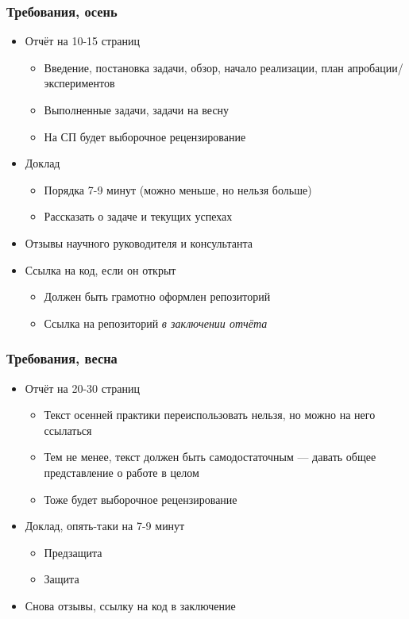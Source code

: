 \documentclass{../../slides-style}
\begin{document}
    \begin{frame}
        \frametitle{Требования, осень}
        \begin{itemize}
            \item Отчёт на 10-15 страниц
            \begin{itemize}
                \item Введение, постановка задачи, обзор, начало реализации, план апробации/экспериментов
                \item Выполненные задачи, задачи на весну
                \item На СП будет выборочное рецензирование
            \end{itemize}
            \item Доклад
            \begin{itemize}
                \item Порядка 7-9 минут (можно меньше, но нельзя больше)
                \item Рассказать о задаче и текущих успехах
            \end{itemize}
            \item Отзывы научного руководителя и консультанта
            \item Ссылка на код, если он открыт
            \begin{itemize}
                \item Должен быть грамотно оформлен репозиторий
                \item Ссылка на репозиторий \emph{в заключении отчёта}
            \end{itemize}
        \end{itemize}
    \end{frame}

    \begin{frame}
        \frametitle{Требования, весна}
        \begin{itemize}
            \item Отчёт на 20-30 страниц
            \begin{itemize}
                \item Текст осенней практики переиспользовать нельзя, но можно на него ссылаться
                \item Тем не менее, текст должен быть самодостаточным --- давать общее представление о работе в целом
                \item Тоже будет выборочное рецензирование
            \end{itemize}
            \item Доклад, опять-таки на 7-9 минут
            \begin{itemize}
                \item Предзащита
                \item Защита
            \end{itemize}
            \item Снова отзывы, ссылку на код в заключение
        \end{itemize}
    \end{frame}
\end{document}
